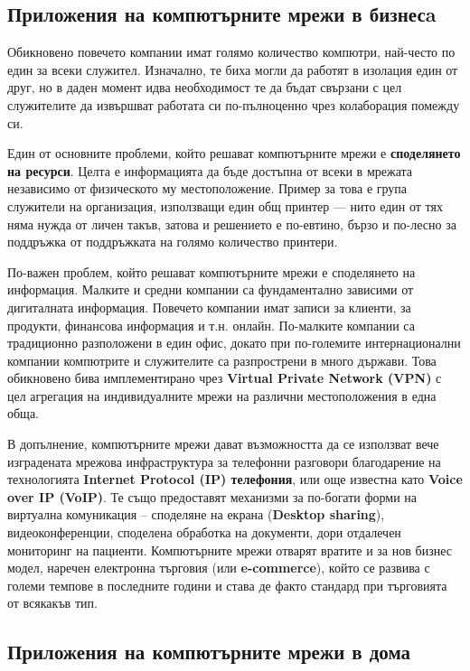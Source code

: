\documentclass[12pt,a4paper,oneside]{book}
\begin{document}
\subsection{Приложения на компютърните мрежи в бизнесa}

Обикновено повечето компании имат голямо количество компютри, най-често по един
за всеки служител. Изначално, те биха могли да работят в изолация един от друг,
но в даден момент идва необходимост те да бъдат свързани с цел служителите да
извършват работата си по-пълноценно чрез колаборация помежду си.

Един от основните проблеми, който решават компютърните мрежи е
\textbf{споделянето на ресурси}. Целта е информацията да бъде достъпна от всеки
в мрежата независимо от физическото му местоположение. Пример за това е група
служители на организация, използващи един общ принтер --- нито един от тях няма
нужда от личен такъв, затова и решението е по-евтино, бързо и по-лесно за
поддръжка от поддръжката на голямо количество принтери.

По-важен проблем, който решават компютърните мрежи е споделянето на
информация. Малките и средни компании са фундаментално зависими от дигиталната
информация. Повечето компании имат записи за клиенти, за продукти, финансова
информация и т.н. онлайн. По-малките компании са традиционно разположени в един
офис, докато при по-големите интернационални компании компютрите и служителите
са разпрострени в много държави. Това обикновено бива имплементирано чрез
\textbf{Virtual Private Network (VPN)} с цел агрегация на
индивидуалните мрежи на различни местоположения в една обща.

В допълнение, компютърните мрежи дават възможността да се използват вече
изградената мрежова инфраструктура за телефонни разговори благодарение на 
технологията \textbf{Internet Protocol (IP) телефония}, или още известна като
\textbf{Voice over IP (VoIP)}. Те също предоставят механизми за по-богати
форми на виртуална комуникация -- споделяне на екрана
(\textbf{Desktop sharing}), видеоконференции, споделена обработка на документи,
дори отдалечен мониторинг на пациенти. Компютърните мрежи отварят вратите и
за нов бизнес модел, наречен електронна търговия (или \textbf{e-commerce}),
който се развива с големи темпове в последните години и става де
факто стандард при търговията от всякакъв тип.  \cite{tanenbaum_computer_2011}

\subsection{Приложения на компютърните мрежи в дома}
\end{document}
